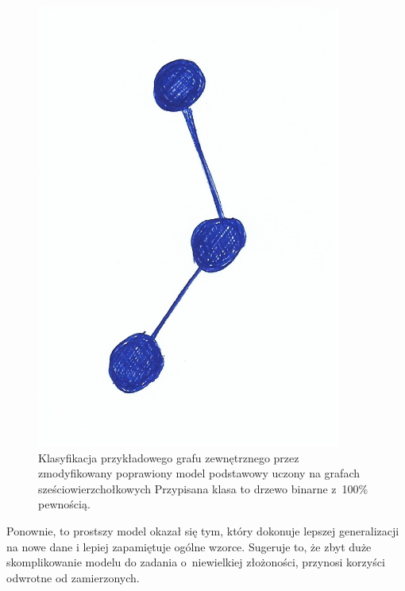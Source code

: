 \begin{figure}[ht]
	\centering
	\includegraphics[width=10cm]{../graph_classification/test_graphs/drawn/path-4.png}
	\caption{Klasyfikacja przykładowego grafu zewnętrznego przez zmodyfikowany poprawiony model podstawowy
		uczony na grafach sześciowierzchołkowych
		Przypisana klasa to drzewo binarne z~100\% pewnością.}
	\label{Fig:tests-best-1d}
\end{figure}
\FloatBarrier

Ponownie, to prostszy model okazał się tym, który dokonuje lepszej generalizacji na nowe dane
i lepiej zapamiętuje ogólne wzorce.
Sugeruje to, że zbyt duże skomplikowanie modelu do zadania o~niewielkiej złożoności,
przynosi korzyści odwrotne od zamierzonych.